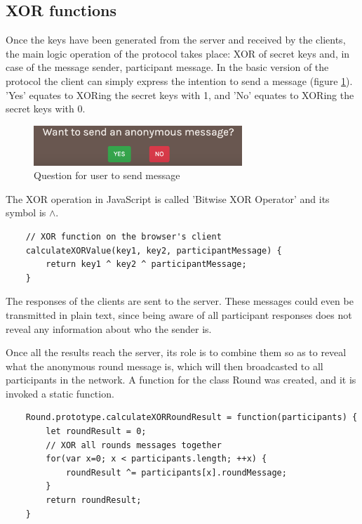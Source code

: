 \subsection{XOR functions}
Once the keys have been generated from the server and received by the clients, the main logic operation of the protocol takes place: XOR of secret keys and, in case of the message sender, participant message. In the basic version of the protocol the client can simply express the intention to send a message (figure \ref{fig:sendMessageQuestion}). 'Yes' equates to XORing the secret keys with 1, and 'No' equates to XORing the secret keys with 0.


\begin{figure}[H]
    \centering
    \includegraphics[width=0.7\textwidth]{Images/Implementation/sendMessageQuestion.png}
    \caption{Question for user to send message}
    \label{fig:sendMessageQuestion}
\end{figure}



\noindent The XOR operation in JavaScript is called 'Bitwise XOR Operator' \cite{XORJS} and its symbol is $\wedge$.
\begin{lstlisting}
    // XOR function on the browser's client
    calculateXORValue(key1, key2, participantMessage) {
        return key1 ^ key2 ^ participantMessage;
    }
\end{lstlisting}

The responses of the clients are sent to the server. These messages could even be transmitted in plain text, since being aware of all participant responses does not reveal any information about who the sender is. \newline

Once all the results reach the server, its role is to combine them so as to reveal what the anonymous round message is, which will then broadcasted to all participants in the network. A function for the class Round was created, and it is invoked a static function.

\begin{lstlisting}
    Round.prototype.calculateXORRoundResult = function(participants) {
        let roundResult = 0;
        // XOR all rounds messages together
        for(var x=0; x < participants.length; ++x) {
            roundResult ^= participants[x].roundMessage;
        }
        return roundResult;
    }
\end{lstlisting}


